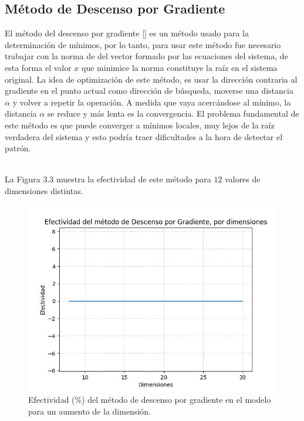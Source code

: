 \subsection{M\'etodo de Descenso por Gradiente}

\par El m\'etodo del descenso por gradiente [\cite{23}] es un m\'etodo usado para la determinaci\'on de m\'inimos, por lo tanto, para usar este m\'etodo fue necesario trabajar con la norma de del vector formado por las ecuaciones del sistema, de esta forma el valor $x$ que minimice la norma constituye la ra\'iz en el sistema original. La idea de optimizaci\'on de este m\'etodo, es usar la direcci\'on contraria al gradiente en el punto actual como direcci\'on de b\'usqueda, moverse una distancia $\alpha$ y volver a repetir la operaci\'on. A medida que vaya acerc\'andose al m\'inimo, la distancia $\alpha$ se reduce y m\'as lenta es la convergencia. El problema fundamental de este m\'etodo es que puede converger a m\'inimos locales, muy lejos de la ra\'iz verdadera del sistema y esto podr\'ia traer dificultades a la hora de detectar el patr\'on.\\\

\par La Figura 3.3 muestra la efectividad de este m\'etodo para $12$ valores de dimensiones distintas.\\

\begin{figure}[h]
\center
\includegraphics[scale=.45]{Graphics/DescensoGradiente.png}
\caption{Efectividad (\%) del m\'etodo de descenso por gradiente en el modelo para un aumento de la dimensi\'on.}
\end{figure}

